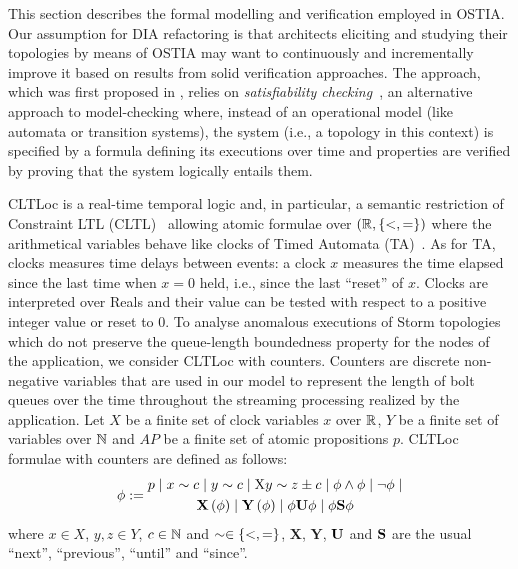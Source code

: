 This section describes the formal modelling and verification employed in OSTIA. Our assumption for DIA refactoring is that architects eliciting and studying their topologies by means of OSTIA may want to continuously and incrementally improve it based on results from solid verification approaches. The approach, which was first proposed in \cite{MBER16}, relies on \textit{satisfiability checking}~\cite{MPS13}, an alternative approach to model-checking where, instead of an operational model (like automata or transition systems), the system (i.e., a topology in this context) is specified by a formula defining its executions over time and properties are verified by proving that the system logically entails them.

CLTLoc is a real-time temporal logic and, in particular, a semantic restriction of Constraint LTL (CLTL)~\cite{DD07} allowing atomic formulae over $(\mathbb{R}, \{ <,= \})$ where the arithmetical variables behave like clocks of Timed Automata (TA)~\cite{timed}.
As for TA, clocks measures time delays between events: a clock $x$ measures the time elapsed since the last time when $x=0$ held, i.e., since the last ``reset'' of $x$.
Clocks are interpreted over Reals and their value can be tested with respect to a positive integer value or reset to 0.
%
To analyse anomalous executions of Storm topologies which do not preserve the queue-length boundedness property for the nodes of the application, we consider CLTLoc with counters.
Counters are discrete non-negative variables that are used in our model to represent the length of bolt queues over the time throughout the streaming processing realized by the application.
Let $X$ be a finite set of clock variables $x$ over $\mathbb{R}$, $Y$ be a finite set of variables over $\mathbb{N}$ and $AP$ be a finite set of atomic propositions $p$.
CLTLoc formulae with counters are defined as follows:
\begin{equation*}%
  \phi :=
  \begin{gathered}
    p \mid x\sim c \mid y\sim c\mid \aX y\sim z\pm c \mid\phi \wedge \phi \mid \neg \phi \mid \\
       \X{\phi} \mid \Y{\phi} %
\mid \phi\U\phi \mid \phi\Snc\phi
  \end{gathered}
\end{equation*}
where $x \in X$, $y,z \in Y$, $c \in \mathbb{N}$ and 
$\sim \in \{ <,= \}$, $\mathbf{X}$, $\mathbf{Y}$, $\mathbf{U}$ and $\mathbf{S}$ are the
usual ``next'', ``previous'', ``until'' and ``since''.

